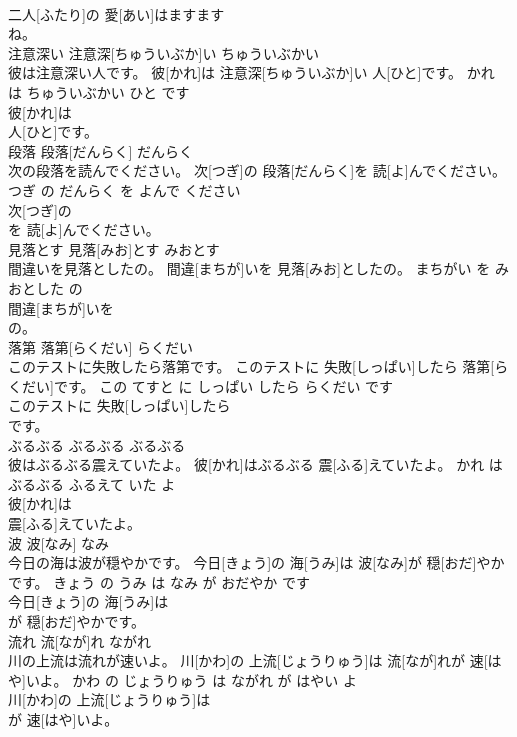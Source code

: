 \documentclass[8pt]{extreport}
\begin{document}
\begin{CJK}{UTF8}{min}
\\	二人[ふたり]の 愛[あい]はますます
\\	ね。			
\\	注意深い	注意深[ちゅういぶか]い	ちゅういぶかい	
\\	彼は注意深い人です。	彼[かれ]は 注意深[ちゅういぶか]い 人[ひと]です。	かれ は ちゅういぶかい ひと です	
\\	彼[かれ]は
\\	人[ひと]です。			
\\	段落	段落[だんらく]	だんらく	
\\	次の段落を読んでください。	次[つぎ]の 段落[だんらく]を 読[よ]んでください。	つぎ の だんらく を よんで ください	
\\	次[つぎ]の
\\	を 読[よ]んでください。			
\\	見落とす	見落[みお]とす	みおとす	
\\	間違いを見落としたの。	間違[まちが]いを 見落[みお]としたの。	まちがい を みおとした の	
\\	間違[まちが]いを
\\	の。			
\\	落第	落第[らくだい]	らくだい	
\\	このテストに失敗したら落第です。	このテストに 失敗[しっぱい]したら 落第[らくだい]です。	この てすと に しっぱい したら らくだい です	
\\	このテストに 失敗[しっぱい]したら
\\	です。			
\\	ぶるぶる	ぶるぶる	ぶるぶる	
\\	彼はぶるぶる震えていたよ。	彼[かれ]はぶるぶる 震[ふる]えていたよ。	かれ は ぶるぶる ふるえて いた よ	
\\	彼[かれ]は
\\	震[ふる]えていたよ。			
\\	波	波[なみ]	なみ	
\\	今日の海は波が穏やかです。	今日[きょう]の 海[うみ]は 波[なみ]が 穏[おだ]やかです。	きょう の うみ は なみ が おだやか です	
\\	今日[きょう]の 海[うみ]は
\\	が 穏[おだ]やかです。			
\\	流れ	流[なが]れ	ながれ	
\\	川の上流は流れが速いよ。	川[かわ]の 上流[じょうりゅう]は 流[なが]れが 速[はや]いよ。	かわ の じょうりゅう は ながれ が はやい よ	
\\	川[かわ]の 上流[じょうりゅう]は
\\	が 速[はや]いよ。			

\end{CJK}
\end{document}
